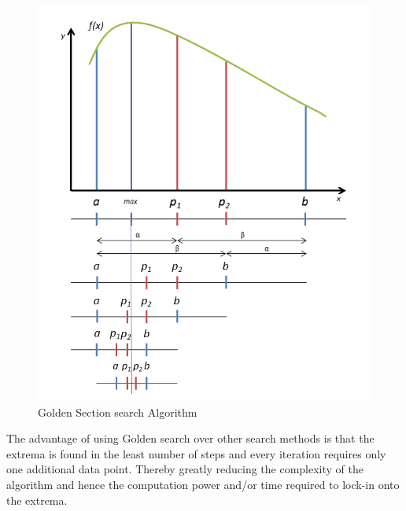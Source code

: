 { 
\begin{figure}[H]
  \begin{center}
  \includegraphics[width=\textwidth]{images/Golden_search_curve}
  \caption{ Golden Section search Algorithm }
  \label{fig:Golden_search_curve}
  \end{center}
  \end{figure}
  
The advantage of using Golden search over other search methods is that the extrema is found in the least number of steps and every iteration requires only one additional data point. Thereby greatly reducing the complexity of the algorithm and hence the computation power and/or time required to lock-in onto the extrema.
 
}

